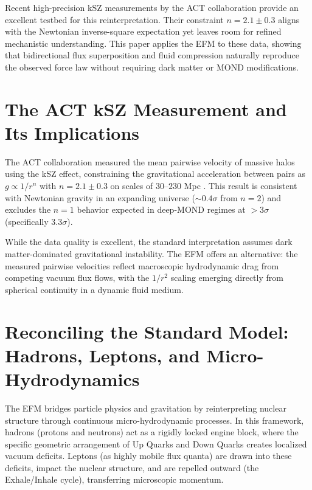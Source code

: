 \documentclass[11pt, a4paper]{article}
\begin{document}
Recent high-precision kSZ measurements by the ACT collaboration \cite{gallardo2026} provide an excellent testbed for this reinterpretation. Their constraint $n = 2.1 \pm 0.3$ aligns with the Newtonian inverse-square expectation yet leaves room for refined mechanistic understanding. This paper applies the EFM to these data, showing that bidirectional flux superposition and fluid compression naturally reproduce the observed force law without requiring dark matter or MOND modifications.

\section{The ACT kSZ Measurement and Its Implications}
The ACT collaboration measured the mean pairwise velocity of massive halos using the kSZ effect, constraining the gravitational acceleration between pairs as $g \propto 1/r^n$ with $n = 2.1 \pm 0.3$ on scales of $30$--$230$ Mpc \cite{gallardo2026}. This result is consistent with Newtonian gravity in an expanding universe ($\sim 0.4\sigma$ from $n=2$) and excludes the $n=1$ behavior expected in deep-MOND regimes at $>3\sigma$ (specifically $3.3\sigma$).

While the data quality is excellent, the standard interpretation assumes dark matter-dominated gravitational instability. The EFM offers an alternative: the measured pairwise velocities reflect macroscopic hydrodynamic drag from competing vacuum flux flows, with the $1/r^2$ scaling emerging directly from spherical continuity in a dynamic fluid medium.

\section{Reconciling the Standard Model: Hadrons, Leptons, and Micro-Hydrodynamics}
The EFM bridges particle physics and gravitation by reinterpreting nuclear structure through continuous micro-hydrodynamic processes. In this framework, hadrons (protons and neutrons) act as a rigidly locked engine block, where the specific geometric arrangement of Up Quarks and Down Quarks creates localized vacuum deficits. Leptons (as highly mobile flux quanta) are drawn into these deficits, impact the nuclear structure, and are repelled outward (the Exhale/Inhale cycle), transferring microscopic momentum. 
\end{document}
